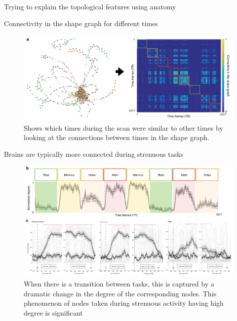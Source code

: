 \documentclass{beamer}
\begin{document}
\begin{frame}{Trying to explain the topological features using anatomy}
     
\end{frame}

\begin{frame}{Connectivity in the shape graph for different times}
    \begin{figure}
        \includegraphics[width = 0.95\linewidth]{fig5a.png}
        \caption{Shows which times during the scan were similar to other times by looking at the connections between times in the shape graph.}
    \end{figure}
\end{frame}

\begin{frame}{Brains are typically more connected during strenuous tasks}
    \begin{figure}
        \includegraphics[width = 0.85\linewidth]{fig5b.png}
        \caption{When there is a transition between tasks, this is captured by a dramatic change in the degree of the corresponding nodes. This phenomenon of nodes taken during strenuous activity having high degree is significant}
    \end{figure}
\end{frame}

\begin{frame}{}
    
\end{frame}
\end{document}
